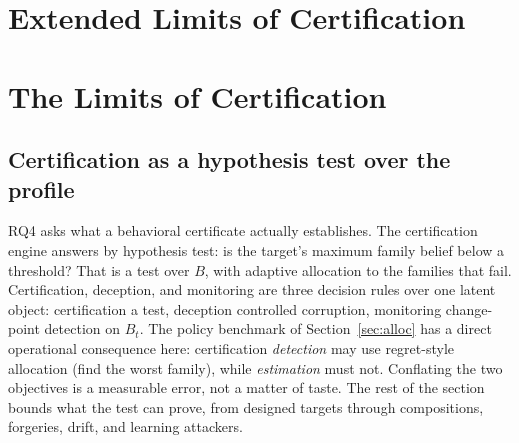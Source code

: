 \section{Extended Limits of Certification}
\label{sec:supp-cert}

\section{The Limits of Certification}\label{sec:limitscert}

\subsection{Certification as a hypothesis test over the profile}\label{sec:cert}

RQ4 asks what a behavioral certificate actually establishes. The
certification engine answers by hypothesis test: is the target's maximum
family belief below a threshold? That is a test over $B$, with adaptive
allocation to the families that fail. Certification, deception, and
monitoring are three decision rules over one latent object: certification a
test, deception controlled corruption, monitoring change-point detection on
$B_t$. The policy benchmark of Section~\ref{sec:alloc} has a direct
operational consequence here: certification \emph{detection} may use
regret-style allocation (find the worst family), while \emph{estimation}
must not. Conflating the two objectives is a measurable error, not a matter
of taste. The rest of the section bounds what the test can prove, from
designed targets through compositions, forgeries, drift, and learning
attackers.

